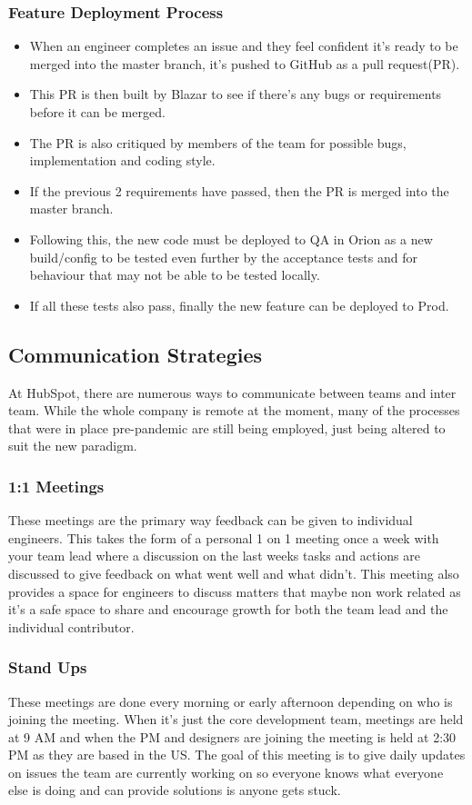 \documentclass[12pt]{article} %
\begin{document}
\subsubsection{Feature Deployment Process}
\begin{itemize}
\item When an engineer completes an issue and they feel confident it's ready to be merged into the master branch, it's pushed to GitHub as a pull request(PR).
\item This PR is then built by Blazar to see if there's any bugs or requirements before it can be merged.
\item The PR is also critiqued by members of the team for possible bugs, implementation and coding style.
\item If the previous 2 requirements have passed, then the PR is merged into the master branch.
\item Following this, the new code must be deployed to QA in Orion as a new build/config to be tested even further by the acceptance tests and for behaviour that may not be able to be tested locally.
\item If all these tests also pass, finally the new feature can be deployed to Prod.
\end{itemize}
\subsection{Communication Strategies}
At HubSpot,  there are numerous ways to communicate between teams and inter team. While the whole company is remote at the moment, many of the processes that were in place pre-pandemic are still being employed, just being altered to suit the new paradigm. 
\subsubsection{1:1 Meetings}
These meetings are the primary way feedback can be given to individual engineers. This takes the form of a personal 1 on 1 meeting once a week with your team lead where a discussion on the last weeks tasks and actions are discussed to give feedback on what went well and what didn't.  This meeting also provides a space for engineers to discuss matters that maybe non work related as it's a safe space to share and encourage growth for both the team lead and the individual contributor. 
\subsubsection{Stand Ups}
These meetings are done every morning or early afternoon depending on who is joining the meeting. When it's just the core development team, meetings are held at 9 AM and when the PM and designers are joining the meeting is held at 2:30 PM as they are based in the US.  The goal of this meeting is to give daily updates on issues the team are currently working on so everyone knows what everyone else is doing and can provide solutions is anyone gets stuck. 
\\\\
\end{document}
